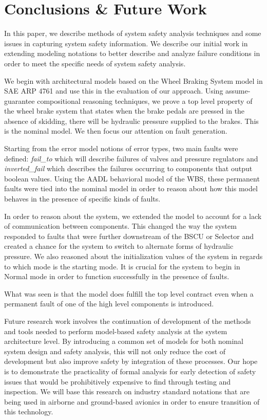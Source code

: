 \section{Conclusions \& Future Work}
In this paper, we describe methods of system safety analysis techniques and some issues in capturing system safety information. We describe our initial work in extending modeling notations to better describe and analyze failure conditions in order to meet the specific needs of system safety analysis. 

We begin with architectural models based on the Wheel Braking System model in SAE ARP 4761 \cite{SAE:ARP4761} and use this in the evaluation of our approach. Using assume-guarantee compositional reasoning techniques, we prove a top level property of the wheel brake system that states when the brake pedals are pressed in the absence of skidding, there will be hydraulic pressure supplied to the brakes. This is the nominal model. We then focus our attention on fault generation. 

Starting from the error model notions of error types, two main faults were defined: \textit{fail\_to} which will describe failures of valves and pressure regulators and \textit{inverted\_fail} which describes the failures occurring to components that output boolean values. Using the AADL behavioral model of the WBS, these permanent faults were tied into the nominal model in order to reason about how this model behaves in the presence of specific kinds of faults. 

In order to reason about the system, we extended the model to account for a lack of communication between components. This changed the way the system responded to faults that were further downstream of the BSCU or Selector and created a chance for the system to switch to alternate forms of hydraulic pressure. We also reasoned about the initialization values of the system in regards to which mode is the starting mode. It is crucial for the system to begin in Normal mode in order to function successfully in the presence of faults. 

What was seen is that the model does fulfill the top level contract even when a permanent fault of one of the high level components is introduced. 

Future research work involves the continuation of development of the methods and tools needed to perform model-based safety analysis at the system architecture level. By introducing a common set of models for both nominal system design and safety analysis, this will not only reduce the cost of development but also improve safety by integration of these processes. Our hope is to demonstrate the practicality of formal analysis for early detection of safety issues that would be prohibitively expensive to find through testing and inspection. We will base this research on industry standard notations that are being used in airborne and ground-based avionics in order to ensure transition of this technology. 





